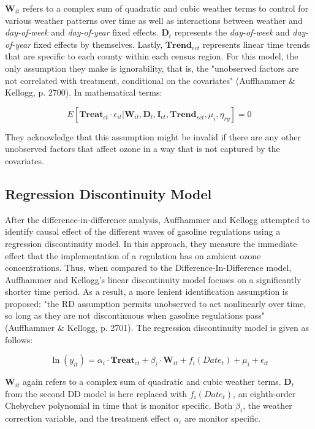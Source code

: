\documentclass{article}
\begin{document}
$\textbf{W}_{it}$ refers to a complex sum of quadratic and cubic weather terms to control for various weather patterns over time as well as interactions between weather and \textit{day-of-week} and \textit{day-of-year} fixed effects. $\textbf{D}_t$ represents the \textit{day-of-week} and \textit{day-of-year} fixed effects by themselves. Lastly, $\textbf{Trend}_{rct}$ represents linear time trends that are specific to each county within each census region. For this model, the only assumption they make is ignorability, that is, the "unobserved factors are not correlated with treatment, conditional on the covariates"  (Auffhammer \& Kellogg, p.  2700). In mathematical terms: 

$$E[\textbf{Treat}_{ct} \cdot \epsilon_{it} | \textbf{W}_{it}, \textbf{D}_{t}, \textbf{I}_{ct}, \textbf{Trend}_{rct}, \mu_i , \eta_{ry}] = 0$$ 

They acknowledge that this assumption might be invalid if there are any other unobserved factors that affect ozone in a way that is not captured by the covariates. 

\subsection{Regression Discontinuity Model}
After the difference-in-difference analysis, Auffhammer and Kellogg attempted to identify causal effect of the different waves of gasoline regulations using a regression discontinuity model. In this approach, they measure the immediate effect that the implementation of a regulation has on ambient ozone concentrations. Thus, when compared to the Difference-In-Difference model, Auffhammer and Kellogg's linear discontinuity model focuses on a significantly shorter time period. As a result, a more lenient identification assumption is proposed: "the RD assumption permits unobserved to act nonlinearly over time, so long as they are not discontinuous when gasoline regulations pass" (Auffhammer \& Kellogg, p.  2701). The regression discontinuity model is given as follows: 

$$\ln{(y_{it})} = \alpha_i \cdot \textbf{Treat}_{ct} + \beta_{i} \cdot \textbf{W}_{it} + f_{i}(Date_t) + \mu_i  + \epsilon_{it}$$


$\textbf{W}_{it}$ again refers to a complex sum of quadratic and cubic weather terms. $\textbf{D}_{t}$ from the second DD model is here replaced with $f_{i}(Date_t)$, an eighth-order Chebychev polynomial in time that is monitor specific. Both $\beta_{i}$, the weather correction variable, and the treatment effect $\alpha_{i}$ are monitor specific. 
\end{document}
